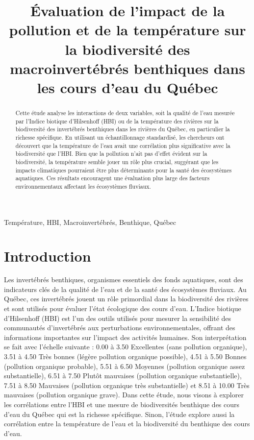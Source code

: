 \documentclass[cm,linguex]{glossa}
\title[]{Évaluation de l'impact de la pollution et de la température sur
la biodiversité des macroinvertébrés benthiques dans les cours d'eau du
Québec}
\author[A. Castonguay, C. Bondu et J. Robin]{
    \spauthor{Antoine Castonguay\\
  \institute{Université de Sherbrooke}\\
  \small{\href{mailto:antoine.castonguay@usherbrooke.ca}{\nolinkurl{antoine.castonguay@usherbrooke.ca}}}
  }%
  \AND  \spauthor{Claudiane Bondu\\
  \institute{Université de Sherbrooke}\\
  \small{\href{mailto:claudiane.bondu@usherbrooke.ca}{\nolinkurl{claudiane.bondu@usherbrooke.ca}}}
  }%
  \AND  \spauthor{Juliette Robin\\
  \institute{Université de Sherbrooke}\\
  \small{\href{mailto:juliette.robin@usherbrooke.ca}{\nolinkurl{juliette.robin@usherbrooke.ca}}}
  }%
  }
\begin{document}
\sffamily
\maketitle

\begin{abstract}
Cette étude analyse les interactions de deux variables, soit la qualité
de l'eau mesurée par l'Indice biotique d'Hilsenhoff (HBI) ou de la
température des rivières sur la biodiversité des invertébrés benthiques
dans les rivières du Québec, en particulier la richesse spécifique. En
utilisant un échantillonnage standardisé, les chercheurs ont découvert
que la température de l'eau avait une corrélation plus significative
avec la biodiversité que l'HBI. Bien que la pollution n'ait pas d'effet
évident sur la biodiversité, la température semble jouer un rôle plus
crucial, suggérant que les impacts climatiques pourraient être plus
déterminants pour la santé des écosystèmes aquatiques. Ces résultats
encouragent une évaluation plus large des facteurs environnementaux
affectant les écosystèmes fluviaux.
\end{abstract}

\begin{keywords}
  Température, HBI, Macroinvertébrés, Benthique, Québec
\end{keywords}

\rmfamily

\hypertarget{introduction}{%
\section{Introduction}\label{introduction}}

Les invertébrés benthiques, organismes essentiels des fonds aquatiques,
sont des indicateurs clés de la qualité de l'eau et de la santé des
écosystèmes fluviaux. Au Québec, ces invertébrés jouent un rôle
primordial dans la biodiversité des rivières et sont utilisés pour
évaluer l'état écologique des cours d'eau. L'Indice biotique
d'Hilsenhoff (HBI) est l'un des outils utilisés pour mesurer la
sensibilité des communautés d'invertébrés aux perturbations
environnementales, offrant des informations importantes sur l'impact des
activités humaines. Son interprétation se fait avec l'échelle suivante :
0.00 à 3.50 Excellentes (sans pollution organique), 3.51 à 4.50 Très
bonnes (légère pollution organique possible), 4.51 à 5.50 Bonnes
(pollution organique probable), 5.51 à 6.50 Moyennes (pollution
organique assez substantielle), 6.51 à 7.50 Plutôt mauvaises (pollution
organique substantielle), 7.51 à 8.50 Mauvaises (pollution organique
très substantielle) et 8.51 à 10.00 Très mauvaises (pollution organique
grave). Dans cette étude, nous visons à explorer les corrélations entre
l'HBI et une mesure de biodiversités benthique des cours d'eau du Québec
qui est la richesse spécifique. Sinon, l'étude explore aussi la
corrélation entre la température de l'eau et la biodiversité du
benthique des cours d'eau.
\end{document}
